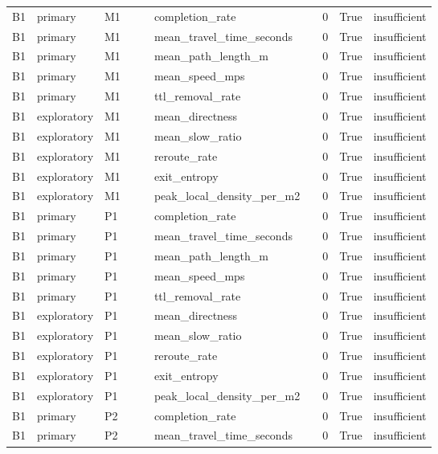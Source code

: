 \begin{tabular}{llllllllll}
B1 & primary & M1 &  &  & completion\_rate &  & 0 & True & insufficient \\
B1 & primary & M1 &  &  & mean\_travel\_time\_seconds &  & 0 & True & insufficient \\
B1 & primary & M1 &  &  & mean\_path\_length\_m &  & 0 & True & insufficient \\
B1 & primary & M1 &  &  & mean\_speed\_mps &  & 0 & True & insufficient \\
B1 & primary & M1 &  &  & ttl\_removal\_rate &  & 0 & True & insufficient \\
B1 & exploratory & M1 &  &  & mean\_directness &  & 0 & True & insufficient \\
B1 & exploratory & M1 &  &  & mean\_slow\_ratio &  & 0 & True & insufficient \\
B1 & exploratory & M1 &  &  & reroute\_rate &  & 0 & True & insufficient \\
B1 & exploratory & M1 &  &  & exit\_entropy &  & 0 & True & insufficient \\
B1 & exploratory & M1 &  &  & peak\_local\_density\_per\_m2 &  & 0 & True & insufficient \\
B1 & primary & P1 &  &  & completion\_rate &  & 0 & True & insufficient \\
B1 & primary & P1 &  &  & mean\_travel\_time\_seconds &  & 0 & True & insufficient \\
B1 & primary & P1 &  &  & mean\_path\_length\_m &  & 0 & True & insufficient \\
B1 & primary & P1 &  &  & mean\_speed\_mps &  & 0 & True & insufficient \\
B1 & primary & P1 &  &  & ttl\_removal\_rate &  & 0 & True & insufficient \\
B1 & exploratory & P1 &  &  & mean\_directness &  & 0 & True & insufficient \\
B1 & exploratory & P1 &  &  & mean\_slow\_ratio &  & 0 & True & insufficient \\
B1 & exploratory & P1 &  &  & reroute\_rate &  & 0 & True & insufficient \\
B1 & exploratory & P1 &  &  & exit\_entropy &  & 0 & True & insufficient \\
B1 & exploratory & P1 &  &  & peak\_local\_density\_per\_m2 &  & 0 & True & insufficient \\
B1 & primary & P2 &  &  & completion\_rate &  & 0 & True & insufficient \\
B1 & primary & P2 &  &  & mean\_travel\_time\_seconds &  & 0 & True & insufficient \\

\end{tabular}
